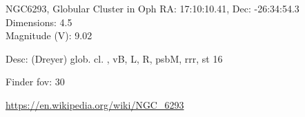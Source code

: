\begin{block}{NGC6293, Globular Cluster in Oph}
    RA: 17:10:10.41, Dec: -26:34:54.3 \\ 
    Dimensions: 4.5 \\ 
    Magnitude (V): 9.02


    Desc: (Dreyer) glob. cl. , vB, L, R, psbM, rrr, st 16 

    Finder fov: 30 

    \url{https://en.wikipedia.org/wiki/NGC_6293} 
\end{block}